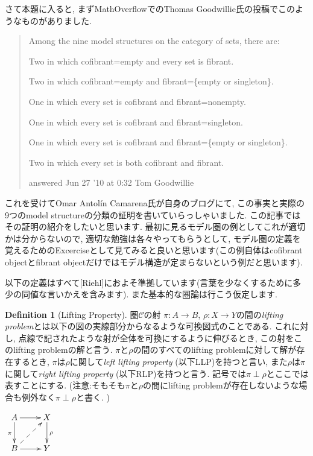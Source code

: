 \documentclass[. /main]{subfiles}
\theoremstyle{definition}
\newtheorem{defi}[theo]{Definition}
\begin{document}
さて本題に入ると, まずMathOverflowでのThomas Goodwillie氏の投稿でこのようなものがありました\cite{Goodwillie}.
\begin{quote}

Among the nine model structures on the category of sets,  there are:

Two in which cofibrant=empty and every set is fibrant. 

Two in which cofibrant=empty and fibrant=\{empty or singleton\}. 

One in which every set is cofibrant and fibrant=nonempty. 

One in which every set is cofibrant and fibrant=singleton. 

One in which every set is cofibrant and fibrant=\{empty or singleton\}. 

Two in which every set is both cofibrant and fibrant. 

\begin{flushright} answered Jun 27 '10 at 0:32
Tom Goodwillie \end{flushright}
\end{quote}

これを受けてOmar Antolín Camarena氏が自身のブログにて, この事実と実際の9つのmodel structureの分類の証明を書いていらっしゃいました\cite{Camarena}. この記事ではその証明の紹介をしたいと思います. 最初に見るモデル圏の例としてこれが適切かは分からないので, 適切な勉強は各々やってもらうとして, モデル圏の定義を覚えるためのExcerciseとして見てみると良いと思います(この例自体はcofibrant objectとfibrant objectだけではモデル構造が定まらないという例だと思います). 

以下の定義はすべて[Riehl]におよそ準拠しています(言葉を少なくするために多少の同値な言いかえを含みます). また基本的な圏論は行こう仮定します.
\begin{defi}[Lifting Property]
圏$\mathcal{C}$の射 $\pi \colon A \to B$, $\rho \colon X \to Y$の間の{\it lifting problem}とは以下の図の実線部分からなるような可換図式のことである. これに対し, 点線で記されたような射が全体を可換にするように伸びるとき, この射をこのlifting problemの解と言う. $\pi$と$\rho$の間のすべてのlifting problemに対して解が存在するとき, $\pi$は$\rho$に関して{\it left lifting property} (以下LLP)を持つと言い, また$\rho$は$\pi$に関して{\it right lifting property} (以下RLP)を持つと言う. 記号では$\pi \perp \rho$とここでは表すことにする. (注意:そもそも$\pi$と$\rho$の間にlifting problemが存在しないような場合も例外なく$\pi \perp \rho$と書く. )
\begin{center}
$\xymatrix{
A \ar[d]_{\pi} \ar[r] \ar@{}[dr] & X \ar[d]^{\rho} \\
B \ar@{-->}[ru] \ar[r] & Y \\
}$
\end{center}
\end{defi}
\end{document}
